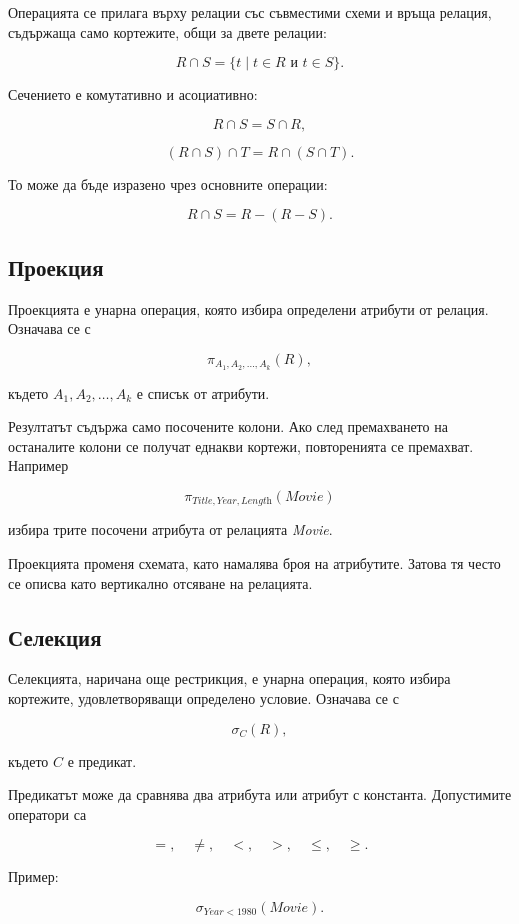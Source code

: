 Операцията се прилага върху релации със съвместими схеми и връща релация, съдържаща само кортежите, общи за двете релации:

\[
R\cap S=\{t\mid t\in R \text{ и } t\in S\}.
\]

Сечението е комутативно и асоциативно:

\[
R\cap S=S\cap R,
\]

\[
(R\cap S)\cap T=R\cap(S\cap T).
\]

То може да бъде изразено чрез основните операции:

\[
R\cap S=R-(R-S).
\]

\subsection{Проекция}\label{s:23.4.4}

Проекцията е унарна операция, която избира определени атрибути от релация. Означава се с

\[
\pi_{A_1,A_2,\ldots,A_k}(R),
\]

където $A_1,A_2,\ldots,A_k$ е списък от атрибути.

Резултатът съдържа само посочените колони. Ако след премахването на останалите колони се получат еднакви кортежи, повторенията се премахват. Например

\[
\pi_{\textit{Title},\textit{Year},\textit{Length}}(\textit{Movie})
\]

избира трите посочени атрибута от релацията \textit{Movie}.

Проекцията променя схемата, като намалява броя на атрибутите. Затова тя често се описва като вертикално отсяване на релацията.

\subsection{Селекция}\label{s:23.4.5}

Селекцията, наричана още рестрикция, е унарна операция, която избира кортежите, удовлетворяващи определено условие. Означава се с

\[
\sigma_C(R),
\]

където $C$ е предикат.

Предикатът може да сравнява два атрибута или атрибут с константа. Допустимите оператори са

\[
=,\quad \neq,\quad <,\quad >,\quad \leq,\quad \geq.
\]

Пример:

\[
\sigma_{\textit{Year}<1980}(\textit{Movie}).
\]

